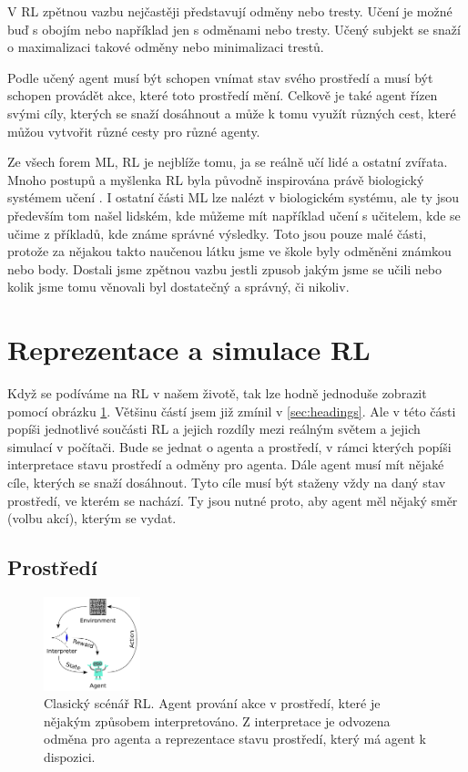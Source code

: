 \documentclass{article}
\begin{document}
V RL zpětnou vazbu nejčastěji představují odměny nebo tresty. Učení je možné buď s obojím nebo například jen s odměnami nebo tresty. Učený subjekt se snaží o maximalizaci takové odměny nebo minimalizaci trestů. 

Podle \cite{sutton1998introduction} učený agent musí být schopen vnímat stav svého prostředí a musí být schopen provádět akce, které toto prostředí mění. Celkově je také agent řízen svými cíly, kterých se snaží dosáhnout a může k tomu využít různých cest, které můžou vytvořit různé cesty pro různé agenty.

Ze všech forem ML, RL je nejblíže tomu, ja se reálně učí lidé a ostatní zvířata. Mnoho postupů a myšlenka RL byla původně inspirována právě biologický systémem učení \cite{sutton1998introduction}. I ostatní části ML lze nalézt v biologickém systému, ale ty jsou především tom našel lidském, kde můžeme mít například učení s učitelem, kde se učime z příkladů, kde známe správné výsledky. Toto jsou pouze malé části, protože za nějakou takto naučenou látku jsme ve škole byly odměněni známkou nebo body. Dostali jsme zpětnou vazbu jestli zpusob jakým jsme se učili nebo kolik jsme tomu věnovali byl dostatečný a správný, či nikoliv.

 
\section{Reprezentace a simulace RL}

Když se podíváme na RL v našem životě, tak lze hodně jednoduše zobrazit pomocí obrázku \ref{zavislostKnnRec}. Většinu částí jsem již zmínil v \ref{sec:headings}. Ale v této části popíši jednotlivé součásti RL a jejich rozdíly mezi reálným světem a jejich simulací v počítači. Bude se jednat o agenta a prostředí, v rámci kterých popíši interpretace stavu prostředí a odměny pro agenta.
Dále agent musí mít nějaké cíle, kterých se snaží dosáhnout. Tyto cíle musí být staženy vždy na daný stav prostředí, ve kterém se nachází. Ty jsou nutné proto, aby agent měl nějaký směr (volbu akcí), kterým se vydat. 

\subsection{Prostředí}

\begin{figure}\centering
	\includegraphics[width=0.25\textwidth]{img/RLdiagram}
 	\caption[]{Clasický scénář RL. Agent prování akce v prostředí, které je nějakým způsobem interpretováno. Z interpretace je odvozena odměna pro agenta a reprezentace stavu prostředí, který má agent k dispozici. \cite{pict} }\label{zavislostKnnRec}
 \end{figure}	
\end{document}
